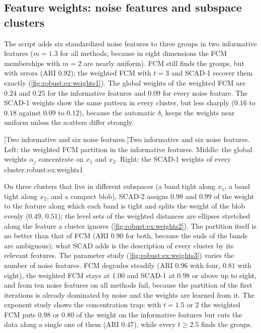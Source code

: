 
\subsection{Feature weights: noise features and subspace clusters}\label{sec:robust:ex:weights}

The script  adds six standardized noise features to three groups in two informative features ($m=1.3$ for all methods, because in eight dimensions the FCM memberships with $m=2$ are nearly uniform). FCM still finds the groups, but with errors (ARI $0.92$); the weighted FCM with $t=3$ and SCAD-1 recover them exactly (\cref{fig:robust:ex:weights1}). The global weights of the weighted FCM are $0.24$ and $0.25$ for the informative features and $0.09$ for every noise feature. The SCAD-1 weights show the same pattern in every cluster, but less sharply ($0.16$ to $0.18$ against $0.09$ to $0.12$), because the automatic $\delta_i$ keeps the weights near uniform unless the scatters differ strongly.

[Two informative and six noise features.]{Two informative and six noise features. Left: the weighted FCM partition in the informative features. Middle: the global weights $\alpha_j$ concentrate on $x_1$ and $x_2$. Right: the SCAD-1 weights of every cluster.}{robust:ex:weights1}

On three clusters that live in different subspaces (a band tight along $x_1$, a band tight along $x_2$, and a compact blob), SCAD-2 assigns $0.98$ and $0.99$ of the weight to the feature along which each band is tight and splits the weight of the blob evenly ($0.49$, $0.51$); the level sets of the weighted distances are ellipses stretched along the feature a cluster ignores (\cref{fig:robust:ex:weights2}). The partition itself is no better than that of FCM (ARI $0.90$ for both, because the ends of the bands are ambiguous); what SCAD adds is the description of every cluster by its relevant features. The parameter study (\cref{fig:robust:ex:weights3}) varies the number of noise features. FCM degrades steadily (ARI $0.96$ with four, $0.81$ with eight), the weighted FCM stays at $1.00$ and SCAD-1 at $0.98$ or above up to eight, and from ten noise features on all methods fail, because the partition of the first iterations is already dominated by noise and the weights are learned from it. The exponent study shows the concentration trap: with $t=1.5$ or $2$ the weighted FCM puts $0.98$ or $0.80$ of the weight on the informative features but cuts the data along a single one of them (ARI $0.47$), while every $t\ge2.5$ finds the groups.

